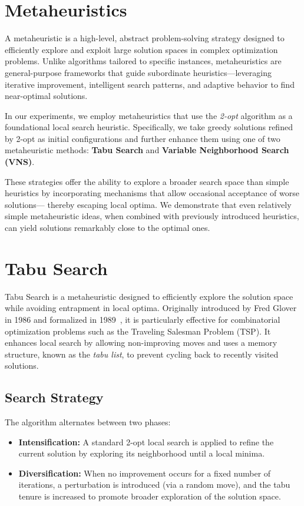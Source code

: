 \section{Metaheuristics}

A metaheuristic is a high-level, abstract problem-solving strategy designed to efficiently explore and exploit large solution spaces 
in complex optimization problems. Unlike algorithms tailored to specific instances, metaheuristics are general-purpose frameworks 
that guide subordinate heuristics—leveraging iterative improvement, intelligent search patterns, and adaptive behavior to find near-optimal solutions.

In our experiments, we employ metaheuristics that use the \textit{2-opt} algorithm as a foundational local search heuristic. 
Specifically, we take greedy solutions refined by 2-opt as initial configurations and further enhance them using one of two metaheuristic methods: 
\textbf{Tabu Search} and \textbf{Variable Neighborhood Search (VNS)}.

These strategies offer the ability to explore a broader search space than simple heuristics by incorporating mechanisms that allow 
occasional acceptance of worse solutions— thereby escaping local optima. We demonstrate that even relatively simple metaheuristic ideas, 
when combined with previously introduced heuristics, can yield solutions remarkably close to the optimal ones.

\section{Tabu Search}

Tabu Search is a metaheuristic designed to efficiently explore the solution space while avoiding entrapment in local optima. Originally introduced by Fred Glover in 1986 and formalized in 1989~\cite{Glover:TabuSearch}, it is particularly effective for combinatorial optimization problems such as the Traveling Salesman Problem (TSP). It enhances local search by allowing non-improving moves and uses a memory structure, known as the \textit{tabu list}, to prevent cycling back to recently visited solutions.

\subsection{Search Strategy}

The algorithm alternates between two phases:

\begin{itemize}
    \item \textbf{Intensification:} A standard 2-opt local search is applied to refine the current solution by exploring its neighborhood until a local minima.
    \item \textbf{Diversification:} When no improvement occurs for a fixed number of iterations, a perturbation is introduced (via a random move), and the tabu tenure is increased to promote broader exploration of the solution space.
\end{itemize}

